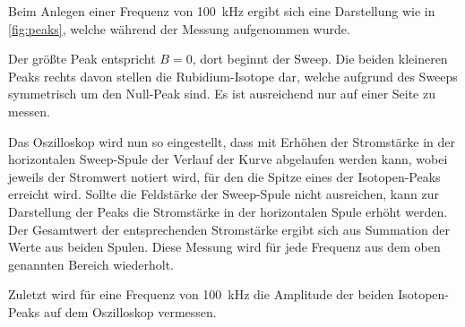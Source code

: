     Beim Anlegen einer Frequenz von \SI{100}{\kilo\hertz} ergibt sich eine Darstellung wie in \autoref{fig:peaks},
    welche während der Messung aufgenommen wurde.

    Der größte Peak entspricht $B = 0$,
    dort beginnt der Sweep.
    Die beiden kleineren Peaks rechts davon stellen die Rubidium-Isotope dar,
    welche aufgrund des Sweeps symmetrisch um den Null-Peak sind.
    Es ist ausreichend nur auf einer Seite zu messen.

    Das Oszilloskop wird nun so eingestellt,
    dass mit Erhöhen der Stromstärke in der horizontalen Sweep-Spule der Verlauf der Kurve abgelaufen werden kann,
    wobei jeweils der Stromwert notiert wird,
    für den die Spitze eines der Isotopen-Peaks erreicht wird.
    Sollte die Feldstärke der Sweep-Spule nicht ausreichen,
    kann zur Darstellung der Peaks die Stromstärke in der horizontalen Spule erhöht werden.
    Der Gesamtwert der entsprechenden Stromstärke ergibt sich aus Summation der Werte aus beiden Spulen.
    Diese Messung wird für jede Frequenz aus dem oben genannten Bereich wiederholt.

    Zuletzt wird für eine Frequenz von \SI{100}{\kilo\hertz} die Amplitude der beiden Isotopen-Peaks auf dem Oszilloskop vermessen.
